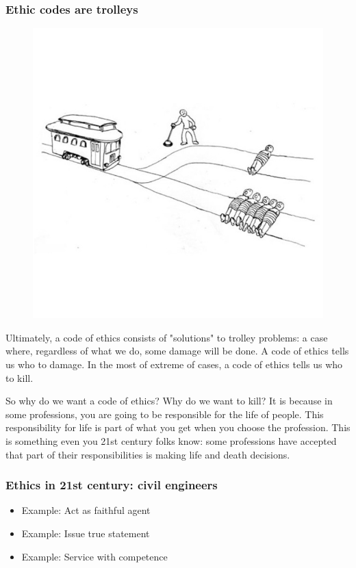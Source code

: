 \begin{frame}[fragile]
\frametitle{Ethic codes are trolleys}

\begin{figure}
\includegraphics[scale=0.25]{trolley}
\end{figure}

\end{frame}

Ultimately, a code of ethics consists of
"solutions"
to trolley problems:
a case where,
regardless of what we do,
some damage will be done.
A code of ethics tells us who to damage.
In the most of extreme of cases,
a code of ethics tells us who to kill.

So why do we want a code of ethics?
Why do we want to kill?
It is because in some professions,
you are going to be responsible for the life of people.
This responsibility for life is part of what you get
when you choose the profession.
This is something even you 21st century folks know:
some professions have accepted that part of their responsibilities
is making life and death decisions.

\begin{frame}[fragile]
\frametitle{Ethics in 21st century: civil engineers}

\begin{itemize}
\item Example: Act as faithful agent\pause
\item Example: Issue true statement\pause
\item Example: Service with competence
\end{itemize}

\end{frame}


